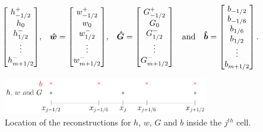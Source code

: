 \begin{enumerate}[(i)]
\begin{align*}
\begin{bmatrix}
	h^+_{-1/2} \\ h_0 \\ h^-_{1/2} \\ \vdots  \\ h^-_{m+1/2}\end{bmatrix} &,&
	\boldsymbol{\hat{w}} = \begin{bmatrix}
	w^+_{-1/2} \\ w_0 \\ w^-_{1/2}  \\ \vdots  \\ w^-_{m+1/2}\end{bmatrix} &,& \boldsymbol{\hat{G}} = \begin{bmatrix}
	G^+_{-1/2} \\ G_0 \\ G^-_{1/2}  \\ \vdots \\ G^-_{m+1/2}
	\end{bmatrix} & &\text{and}& & \boldsymbol{\hat{b}} = \begin{bmatrix}
	b_{-1/2} \\ b_{-1/6} \\ b_{1/6}  \\b_{1/2}  \\ \vdots \\ b_{m+1/2}
	\end{bmatrix}.
	\end{align*}
	
	\begin{figure}
		\centering
		\includegraphics[width=0.8\textwidth]{./chp3/figures/FEVMRecon.pdf}
		\caption{Location of the reconstructions for $h$, $w$, $G$ and $b$ inside the $j^{th}$ cell.}
		\label{fig:ReconLocs}
	\end{figure}
	

\end{enumerate}
